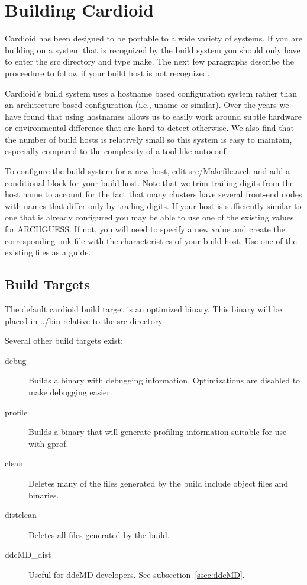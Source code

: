 \documentclass{article}
\begin{document}
\def\path#1{#1}

\long{}

\section{Building Cardioid}

Cardioid has been designed to be portable to a wide variety of systems.
If you are building on a system that is recognized by the build system
you should only have to enter the src directory and type make.  The next
few paragraphs describe the proceedure to follow if your build host is
not recognized.

Cardioid's build system uses a hostname based configuration system
rather than an architecture based configuration (i.e., uname or
similar).  Over the years we have found that using hostnames allows us
to easily work around subtle hardware or environmental difference that
are hard to detect otherwise.  We also find that the number of build
hosts is relatively small so this system is easy to maintain, especially
compared to the complexity of a tool like autoconf.

To configure the build system for a new host, edit
\path{src/Makefile.arch} and add a conditional block for your build
host.  Note that we trim trailing digits from the host name to account
for the fact that many clusters have several front-end nodes with names
that differ only by trailing digits.  If your host is sufficiently
similar to one that is already configured you may be able to use one of
the existing values for ARCHGUESS.  If not, you will need to specify a
new value and create the corresponding \path{.mk} file with the
characteristics of your build host.  Use one of the existing files as a
guide.

\subsection{Build Targets}

The default cardioid build target is an optimized binary.  This binary
will be placed in \path{../bin} relative to the \path{src} directory.

Several other build targets exist:
\par\noindent
\begin{description}
\item[debug]  Builds a binary with debugging information.  Optimizations are
  disabled to make debugging easier.
\item[profile] Builds a binary that will generate profiling information
  suitable for use with gprof.
\item[clean]  Deletes many of the files generated by the build include
  object files and binaries.
\item[distclean] Deletes all files generated by the build.
\item[ddcMD\_dist] Useful for ddcMD developers.  See
  subsection~\ref{ssec:ddcMD}.
\end{description}
\end{document}
